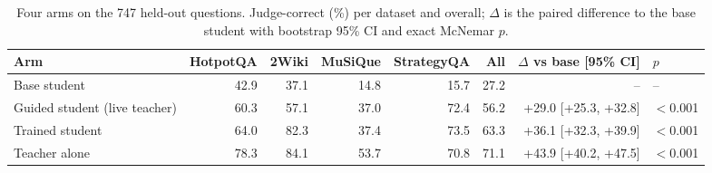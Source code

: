 \begin{table}[t]
\centering
\small
\caption{Four arms on the 747 held-out questions. Judge-correct (\%) per dataset and overall; $\Delta$ is the paired difference to the base student with bootstrap 95\% CI and exact McNemar $p$.}
\label{tab:E00-main}
\begin{tabular}{lrrrrrrl}
\toprule
Arm & HotpotQA & 2Wiki & MuSiQue & StrategyQA & All & $\Delta$ vs base [95\% CI] & $p$ \\
\midrule
Base student & 42.9 & 37.1 & 14.8 & 15.7 & 27.2 & -- & -- \\
Guided student (live teacher) & 60.3 & 57.1 & 37.0 & 72.4 & 56.2 & +29.0 [+25.3, +32.8] & $<$0.001 \\
Trained student & 64.0 & 82.3 & 37.4 & 73.5 & 63.3 & +36.1 [+32.3, +39.9] & $<$0.001 \\
Teacher alone & 78.3 & 84.1 & 53.7 & 70.8 & 71.1 & +43.9 [+40.2, +47.5] & $<$0.001 \\
\bottomrule
\end{tabular}
\end{table}
